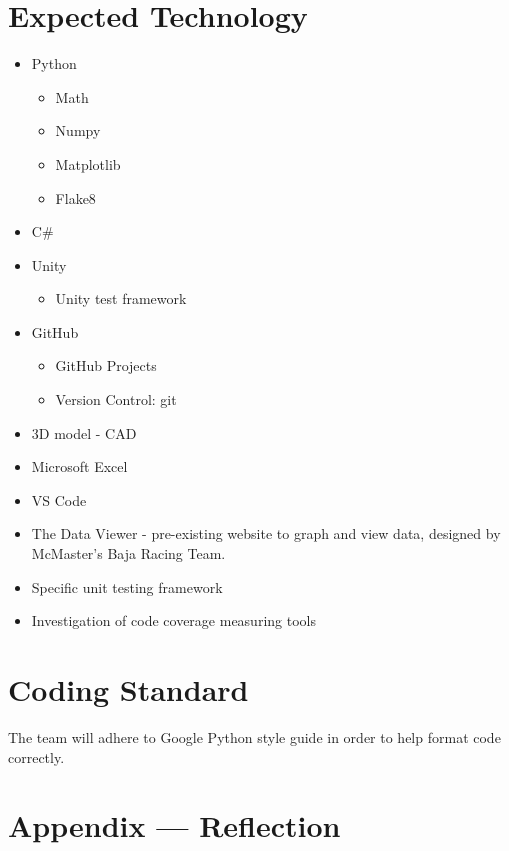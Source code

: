 \documentclass{article}
\begin{document}
\section{Expected Technology}


\begin{itemize}
\item Python
\begin{itemize}
  \item Math
  \item Numpy
  \item Matplotlib
  \item Flake8
\end{itemize}
\item C\#
\item Unity
\begin{itemize}
  \item Unity test framework
\end{itemize}
\item GitHub
\begin{itemize}
  \item GitHub Projects
  \item Version Control: git
\end{itemize}
\item 3D model - CAD
\item Microsoft Excel
\item VS Code
\item The Data Viewer - pre-existing website to graph and view data, designed by McMaster's Baja Racing Team.
\item Specific unit testing framework
\item Investigation of code coverage measuring tools
\end{itemize}

\section{Coding Standard}

The team will adhere to Google Python style guide in order to help format code correctly. 

\newpage{}

\section*{Appendix --- Reflection}


\end{document}
